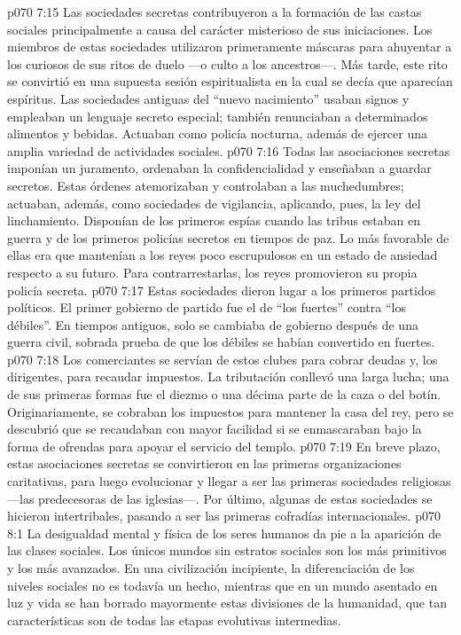 \vs p070 7:15 \pc Las sociedades secretas contribuyeron a la formación de las castas sociales principalmente a causa del carácter misterioso de sus iniciaciones. Los miembros de estas sociedades utilizaron primeramente máscaras para ahuyentar a los curiosos de sus ritos de duelo ---o culto a los ancestros---. Más tarde, este rito se convirtió en una supuesta sesión espiritualista en la cual se decía que aparecían espíritus. Las sociedades antiguas del “nuevo nacimiento” usaban signos y empleaban un lenguaje secreto especial; también renunciaban a determinados alimentos y bebidas. Actuaban como policía nocturna, además de ejercer una amplia variedad de actividades sociales.
\vs p070 7:16 Todas las asociaciones secretas imponían un juramento, ordenaban la confidencialidad y enseñaban a guardar secretos. Estas órdenes atemorizaban y controlaban a las muchedumbres; actuaban, además, como sociedades de vigilancia, aplicando, pues, la ley del linchamiento. Disponían de los primeros espías cuando las tribus estaban en guerra y de los primeros policías secretos en tiempos de paz. Lo más favorable de ellas era que mantenían a los reyes poco escrupulosos en un estado de ansiedad respecto a su futuro. Para contrarrestarlas, los reyes promovieron su propia policía secreta.
\vs p070 7:17 Estas sociedades dieron lugar a los primeros partidos políticos. El primer gobierno de partido fue el de “los fuertes” contra “los débiles”. En tiempos antiguos, solo se cambiaba de gobierno después de una guerra civil, sobrada prueba de que los débiles se habían convertido en fuertes.
\vs p070 7:18 Los comerciantes se servían de estos clubes para cobrar deudas y, los dirigentes, para recaudar impuestos. La tributación conllevó una larga lucha; una de sus primeras formas fue el diezmo o una décima parte de la caza o del botín. Originariamente, se cobraban los impuestos para mantener la casa del rey, pero se descubrió que se recaudaban con mayor facilidad si se enmascaraban bajo la forma de ofrendas para apoyar el servicio del templo.
\vs p070 7:19 En breve plazo, estas asociaciones secretas se convirtieron en las primeras organizaciones caritativas, para luego evolucionar y llegar a ser las primeras sociedades religiosas ---las predecesoras de las iglesias---. Por último, algunas de estas sociedades se hicieron intertribales, pasando a ser las primeras cofradías internacionales.
\vs p070 8:1 La desigualdad mental y física de los seres humanos da pie a la aparición de las clases sociales. Los únicos mundos sin estratos sociales son los más primitivos y los más avanzados. En una civilización incipiente, la diferenciación de los niveles sociales no es todavía un hecho, mientras que en un mundo asentado en luz y vida se han borrado mayormente estas divisiones de la humanidad, que tan características son de todas las etapas evolutivas intermedias.

